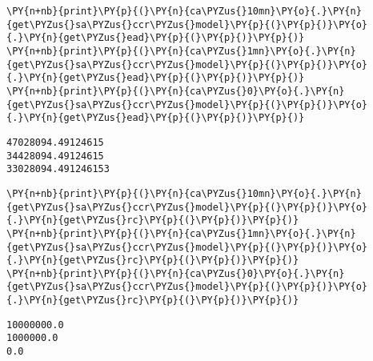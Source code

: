     \begin{tcolorbox}[breakable, size=fbox, boxrule=1pt, pad at break*=1mm,colback=cellbackground, colframe=cellborder]
\begin{Verbatim}[commandchars=\\\{\}]
\PY{n+nb}{print}\PY{p}{(}\PY{n}{ca\PYZus{}10mn}\PY{o}{.}\PY{n}{get\PYZus{}sa\PYZus{}ccr\PYZus{}model}\PY{p}{(}\PY{p}{)}\PY{o}{.}\PY{n}{get\PYZus{}ead}\PY{p}{(}\PY{p}{)}\PY{p}{)}
\PY{n+nb}{print}\PY{p}{(}\PY{n}{ca\PYZus{}1mn}\PY{o}{.}\PY{n}{get\PYZus{}sa\PYZus{}ccr\PYZus{}model}\PY{p}{(}\PY{p}{)}\PY{o}{.}\PY{n}{get\PYZus{}ead}\PY{p}{(}\PY{p}{)}\PY{p}{)}
\PY{n+nb}{print}\PY{p}{(}\PY{n}{ca\PYZus{}0}\PY{o}{.}\PY{n}{get\PYZus{}sa\PYZus{}ccr\PYZus{}model}\PY{p}{(}\PY{p}{)}\PY{o}{.}\PY{n}{get\PYZus{}ead}\PY{p}{(}\PY{p}{)}\PY{p}{)}
\end{Verbatim}
\end{tcolorbox}

    \begin{Verbatim}[commandchars=\\\{\}]
47028094.49124615
34428094.49124615
33028094.491246153
    \end{Verbatim}

    \begin{tcolorbox}[breakable, size=fbox, boxrule=1pt, pad at break*=1mm,colback=cellbackground, colframe=cellborder]
\begin{Verbatim}[commandchars=\\\{\}]
\PY{n+nb}{print}\PY{p}{(}\PY{n}{ca\PYZus{}10mn}\PY{o}{.}\PY{n}{get\PYZus{}sa\PYZus{}ccr\PYZus{}model}\PY{p}{(}\PY{p}{)}\PY{o}{.}\PY{n}{get\PYZus{}rc}\PY{p}{(}\PY{p}{)}\PY{p}{)}
\PY{n+nb}{print}\PY{p}{(}\PY{n}{ca\PYZus{}1mn}\PY{o}{.}\PY{n}{get\PYZus{}sa\PYZus{}ccr\PYZus{}model}\PY{p}{(}\PY{p}{)}\PY{o}{.}\PY{n}{get\PYZus{}rc}\PY{p}{(}\PY{p}{)}\PY{p}{)}
\PY{n+nb}{print}\PY{p}{(}\PY{n}{ca\PYZus{}0}\PY{o}{.}\PY{n}{get\PYZus{}sa\PYZus{}ccr\PYZus{}model}\PY{p}{(}\PY{p}{)}\PY{o}{.}\PY{n}{get\PYZus{}rc}\PY{p}{(}\PY{p}{)}\PY{p}{)}
\end{Verbatim}
\end{tcolorbox}

    \begin{Verbatim}[commandchars=\\\{\}]
10000000.0
1000000.0
0.0
    \end{Verbatim}

